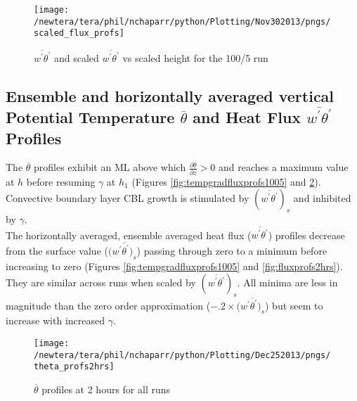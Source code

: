 \begin{figure}[htbp]
    \centering
    \texttt{[image: /newtera/tera/phil/nchaparr/python/Plotting/Nov302013/pngs/scaled\_flux\_profs]}
    \caption[$\overline{w^{'}\theta^{'}}$ scaled by $(\overline{w^{'}\theta^{'}})_{s}$]{$\overline{w^{'}\theta^{'}}$ and scaled $\overline{w^{'}\theta^{'}}$  vs scaled height for the 100/5 run}
    \label{fig:scaledfluxprofs15010}   %
\end{figure}

\clearpage

\subsection{Ensemble and horizontally averaged vertical Potential Temperature $\overline{\theta}$ 
and Heat Flux $\overline{w^{'}\theta^{'}}$ Profiles}
\FloatBarrier

The $\overline{\theta}$ profiles exhibit an \acs{ML} above which  $\frac{\partial\overline{\theta}}{\partial z}>0$ 
and reaches a maximum value at $h$ before resuming $\gamma$  at $h_{1}$ (Figures \ref{fig:tempgradfluxprofs1005} and \ref{fig:pottempprofs2hrs}).  Convective boundary layer \acs{CBL} growth is stimulated by $(\overline{w^{'}\theta^{'}})_{s}$ and inhibited by $\gamma$.\\

The horizontally averaged, ensemble averaged heat flux ($\overline{w^{'}\theta^{'}}$) profiles decrease from the surface value ($(\overline{w^{'}\theta^{'})_{s}}$) passing through zero to a minimum before increasing to zero (Figures \ref{fig:tempgradfluxprofs1005} and  \ref{fig:fluxprofs2hrs}).  They are similar across runs when scaled by $(\overline{w^{'}\theta^{'}})_{s}$. All minima are less  in magnitude than the zero order approximation ($-.2 \times (\overline{w^{'}\theta^{'})_{s}}$) but seem to increase with increased $\gamma$.\\


\begin{figure}[htbp]
    \centering
    \texttt{[image: /newtera/tera/phil/nchaparr/python/Plotting/Dec252013/pngs/theta\_profs2hrs]}
    \caption{$\overline{\theta}$ profiles at 2 hours for all runs}
    \label{fig:pottempprofs2hrs}   %
\end{figure}

